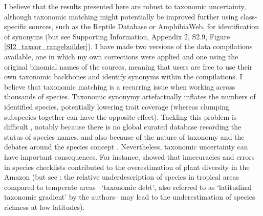 I believe that the results presented here are robust to taxonomic uncertainty, although taxonomic matching might potentially be improved further using class-specific sources, such as the Reptile Database or AmphibiaWeb, for identification of synonyms (but see Supporting Information, Appendix 2, S2.9, Figure \ref{SI2_taxcor_rangebuilder}). I have made two versions of the data compilations available, one in which my own corrections were applied and one using the original binomial names of the sources, meaning that users are free to use their own taxonomic backbones and identify synonyms within the compilations.
I believe that taxonomic matching is a recurring issue when working across thousands of species. Taxonomic synonymy artefactually inflates the numbers of identified species, potentially lowering trait coverage (whereas clumping subspecies together can have the opposite effect). Tackling this problem is difficult \citep{Isaac2004, Jones2012}, notably because there is no global curated database recording the status of species names, and also because of the nature of taxonomy and the debates around the species concept \citep{May2011}. Nevertheless, taxonomic uncertainty can have important consequences. For instance, \citet{Cardoso2017} showed that inaccuracies and errors in species checklists contributed to the overestimation of plant diversity in the Amazon (but see \citet{Freeman2021}: the relative underdescription of species in tropical areas compared to temperate  areas --`taxonomic debt', also referred to as `latitudinal taxonomic gradient' by the authors-- may lead to the underestimation of species richness at low latitudes).

